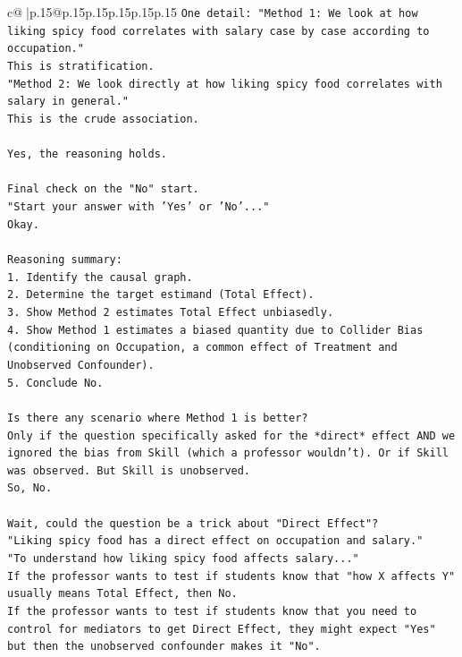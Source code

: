 \documentclass{article}
\begin{document}
{\begin{supertabular}{c@{$\;$}|p{.15\linewidth}@{}p{.15\linewidth}p{.15\linewidth}p{.15\linewidth}p{.15\linewidth}p{.15\linewidth}}
{{{\texttt{One detail: "Method 1: We look at how liking spicy food correlates with salary case by case according to occupation."} \\
\texttt{This is stratification.} \\
\texttt{"Method 2: We look directly at how liking spicy food correlates with salary in general."} \\
\texttt{This is the crude association.} \\
\\ 
\texttt{Yes, the reasoning holds.} \\
\\ 
\texttt{Final check on the "No" start.} \\
\texttt{"Start your answer with 'Yes' or 'No'..."} \\
\texttt{Okay.} \\
\\ 
\texttt{Reasoning summary:} \\
\texttt{1. Identify the causal graph.} \\
\texttt{2. Determine the target estimand (Total Effect).} \\
\texttt{3. Show Method 2 estimates Total Effect unbiasedly.} \\
\texttt{4. Show Method 1 estimates a biased quantity due to Collider Bias (conditioning on Occupation, a common effect of Treatment and Unobserved Confounder).} \\
\texttt{5. Conclude No.} \\
\\ 
\texttt{Is there any scenario where Method 1 is better?} \\
\texttt{Only if the question specifically asked for the *direct* effect AND we ignored the bias from Skill (which a professor wouldn't). Or if Skill was observed. But Skill is unobserved.} \\
\texttt{So, No.} \\
\\ 
\texttt{Wait, could the question be a trick about "Direct Effect"?} \\
\texttt{"Liking spicy food has a direct effect on occupation and salary."} \\
\texttt{"To understand how liking spicy food affects salary..."} \\
\texttt{If the professor wants to test if students know that "how X affects Y" usually means Total Effect, then No.} \\
\texttt{If the professor wants to test if students know that you need to control for mediators to get Direct Effect, they might expect "Yes" but then the unobserved confounder makes it "No".} \\
}}}
\end{supertabular}}
\end{document}
